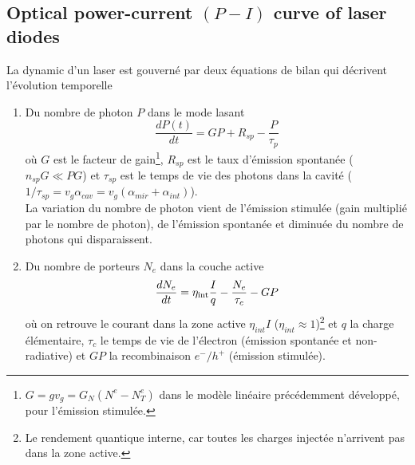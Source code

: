 \subsection{Optical power-current $( P - I )$ curve of laser diodes}
La dynamic d'un laser est gouverné par deux équations de bilan qui décrivent l'évolution temporelle
\begin{enumerate}
\item Du nombre de photon $P$ dans le mode lasant 
\begin{equation}
\frac{{dP(t)}}{{dt}} = GP + {R_{sp}} - \frac{P}{{{\tau _p}}}
\end{equation}
où $G$ est le facteur de gain\footnote{$G = gv_g = G_N(N^e-N^e_T)$ dans le modèle linéaire précédemment
développé, pour l'émission stimulée.}, $R_{sp}$ est le taux d'émission spontanée ($n_{sp}G \ll PG$) et
$\tau_{sp}$ est le temps de vie des photons dans la cavité ($1/\tau_{sp} = v_g\alpha_{cav} = v_g(\alpha_
{mir}+\alpha_{int})$).\\

La variation du nombre de photon vient de l'émission stimulée (gain multiplié par le nombre de photon),
de l'émission spontanée et diminuée du nombre de photons qui disparaissent.\\

\item Du nombre de porteurs $N_e$ dans la couche active
\begin{equation}
\frac{{d{N_e}}}{{dt}} = {\eta _{{\mathop{\rm int}} }}\frac{I}{q} - \frac{{{N_e}}}{{{\tau _c}}} - GP
\end{equation}
où on retrouve le courant dans la zone active $\eta_{int}I$ ($\eta_{int}\approx1$)\footnote{Le rendement
quantique interne, car toutes les charges injectée n'arrivent pas dans la zone active.} et $q$ la charge
élémentaire, $\tau_c$ le temps de vie de l'électron (émission spontanée et non-radiative) et $GP$ la
recombinaison $e^-/h^+$ (émission stimulée).
\end{enumerate}

